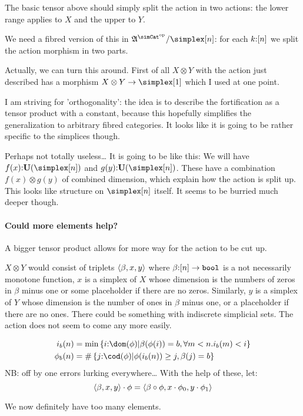 \documentclass[csh.tex]{subfiles}
\begin{document}
The basic tensor above should simply split the action in two actions:
the lower range applies to $X$ and the upper to $Y$.

We need a fibred version of this in $\ambient\s/\simplex[n]$: for each $k\mathord : [n]$ we split the action morphism in two parts.

Actually, we can turn this around. First of all $X\otimes Y$ with the action just described has a morphism $X\otimes Y \to \simplex[1]$ which I used at one point.

I am striving for 'orthogonality': the idea is to describe the fortification as a tensor product with a constant, because this hopefully simplifies the generalization to arbitrary fibred categories.
It looks like it is going to be rather specific to the simplices though.

Perhaps not totally useless\dots
It is going to be like this:
We will have $f(x)\of \base(\simplex[n])$
and $g(y)\of \base(\simplex[n])$.
These have a combination $f(x) \otimes g(y)$ of combined dimension, which explain how the action is split up.
This looks like structure on $\simplex[n]$ itself. It seems to be burried much deeper though.

\paragraph{Could more elements help?}
A bigger tensor product allows for more way for the action to be cut up.


$X\otimes Y$ would consist of triplets $\left\langle \beta,x,y \right\rangle$ where $\beta\mathord : [n]\to\mathtt{bool} $ is a not necessarily monotone function, $x$ is a simplex of $X$ whose dimension is the numbers of zeros in $\beta$ minus one or some placeholder if there are no zeros. 
Similarly, $y$ is a simplex of $Y$ whose dimension is the number of ones in $\beta$ minus one, or a placeholder if there are no ones. 
There could be something with indiscrete simplicial sets.
The action does not seem to come any more easily.

\begin{align*}
i_b(n) &= \min\set{i\of\dom(\phi) | \beta(\phi(i)) = b, \forall m < n. i_b(m) < i}\\
\phi_b(n) &= \#\set{j\of\cod(\phi) | \phi(i_b(n))\geq j, \beta(j) = b}
\end{align*}
NB: off by one errors lurking everywhere\dots
With the help of these, let:
\[ \left\langle \beta,x,y \right\rangle\cdot\phi = \left\langle \beta\circ \phi,x\cdot\phi_0,y\cdot\phi_1 \right\rangle \]

We now definitely have too many elements. 
\end{document}
